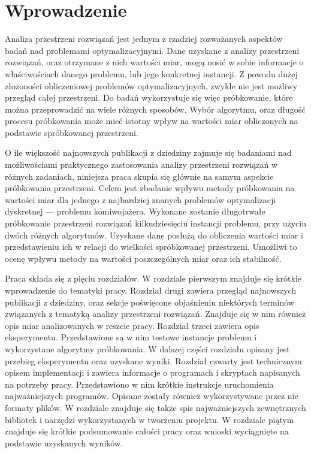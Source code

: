 \chapter{Wprowadzenie}

Analiza przestrzeni rozwiązań jest jednym z rzadziej rozważanych aspektów badań nad problemami optymalizacyjnymi.
Dane uzyskane z analizy przestrzeni rozwiązań, oraz otrzymane z nich wartości miar, mogą nosić w sobie
informacje o właściwościach danego problemu, lub jego konkretnej instancji.
Z powodu dużej złożoności obliczeniowej problemów optymalizacyjnych, zwykle nie jest możliwy przegląd całej przestrzeni.
Do badań wykorzystuje się więc próbkowanie, które można przeprowadzić na wiele różnych sposobów.
Wybór algorytmu, oraz długość procesu próbkowania może mieć istotny wpływ na wartości miar obliczonych na podstawie spróbkowanej przestrzeni.

O ile większość najnowszych publikacji z dziedziny zajmuje się badaniami nad możliwościami praktycznego zastosowania analizy przestrzeni rozwiązań w różnych zadaniach,
niniejsza praca skupia się głównie na samym aspekcie próbkowania przestrzeni.
Celem jest zbadanie wpływu metody próbkowania na wartości miar dla jednego z najbardziej znanych
problemów optymalizacji dyskretnej --- problemu komiwojażera.
Wykonane zostanie długotrwałe próbkowanie przestrzeni rozwiązań kilkudziesięciu instancji problemu, przy użyciu dwóch różnych algorytmów.
Uzyskane dane posłużą do obliczenia wartości miar i przedstawieniu ich w relacji do wielkości spróbkowanej przestrzeni.
Umożliwi to ocenę wpływu metody na wartości poszczególnych miar oraz ich stabilność.

Praca składa się z pięciu rozdziałów.
W rozdziale pierwszym znajduje się krótkie wprowadzenie do tematyki pracy.
Rozdział drugi zawiera przegląd najnowszych publikacji z dziedziny, oraz sekcje poświęcone objaśnieniu niektórych terminów związanych z tematyką
analizy przestrzeni rozwiązań. Znajduje się w nim również opis miar analizowanych w reszcie pracy.
Rozdział trzeci zawiera opis eksperymentu. Przedstawione są w nim testowe instancje problemu i wykorzystane algorytmy próbkowania.
W dalszej części rozdziału opisany jest przebieg eksperymentu oraz uzyskane wyniki.
Rozdział czwarty jest technicznym opisem implementacji i zawiera informacje o programach i skryptach napisanych na potrzeby pracy.
Przedstawiono w nim krótkie instrukcje uruchomienia najważniejszych programów. Opisane zostały również wykorzystywane przez nie formaty plików.
W rozdziale znajduje się także spis najważniejszych zewnętrznych bibliotek i narzędzi wykorzystanych w tworzeniu projektu.
W rozdziale piątym znajduje się krótkie podsumowanie całości pracy oraz wnioski wyciągnięte na podstawie uzyskanych wyników.
